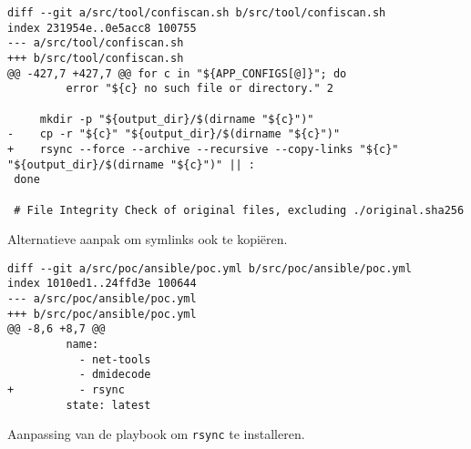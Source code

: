 \begin{listing}
  \begin{verbatim}
diff --git a/src/tool/confiscan.sh b/src/tool/confiscan.sh
index 231954e..0e5acc8 100755
--- a/src/tool/confiscan.sh
+++ b/src/tool/confiscan.sh
@@ -427,7 +427,7 @@ for c in "${APP_CONFIGS[@]}"; do
         error "${c} no such file or directory." 2

     mkdir -p "${output_dir}/$(dirname "${c}")"
-    cp -r "${c}" "${output_dir}/$(dirname "${c}")"
+    rsync --force --archive --recursive --copy-links "${c}" "${output_dir}/$(dirname "${c}")" || :
 done

 # File Integrity Check of original files, excluding ./original.sha256
  \end{verbatim}
  \caption{Alternatieve aanpak om symlinks ook te kopi\"{e}ren.}
  \label{lst:bijlage-rsync-copy-alternative-diff}
\end{listing}

\begin{listing}
  \begin{verbatim}
diff --git a/src/poc/ansible/poc.yml b/src/poc/ansible/poc.yml
index 1010ed1..24ffd3e 100644
--- a/src/poc/ansible/poc.yml
+++ b/src/poc/ansible/poc.yml
@@ -8,6 +8,7 @@
         name:
           - net-tools
           - dmidecode
+          - rsync
         state: latest
  \end{verbatim}
  \caption{Aanpassing van de playbook om \texttt{rsync} te installeren.}
  \label{lst:bijlage-rsync-playbook-diff}
\end{listing}

